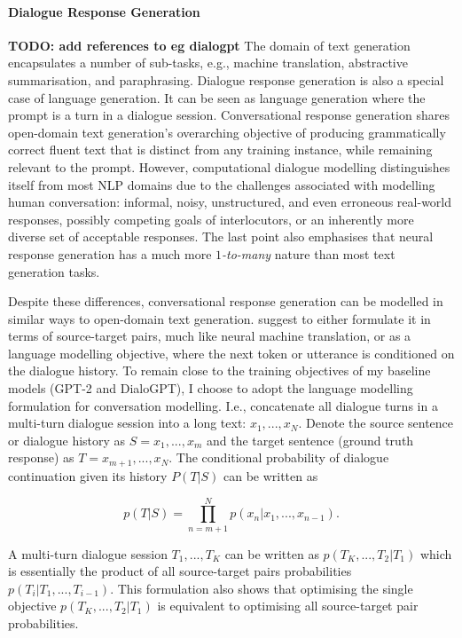 \paragraph{Dialogue Response Generation}
\textbf{TODO: add references to eg dialogpt}
The domain of text generation encapsulates a number of sub-tasks, e.g., machine translation, abstractive summarisation, and paraphrasing. Dialogue response generation is also a special case of language generation. It can be seen as language generation where the prompt is a turn in a dialogue session. Conversational response generation shares open-domain text generation's overarching objective of producing grammatically correct fluent text that is distinct from any training instance, while remaining relevant to the prompt. However, computational dialogue modelling distinguishes itself from most NLP domains due to the challenges associated with modelling human conversation: informal, noisy, unstructured, and even erroneous real-world responses, possibly competing goals of interlocutors, or an inherently more diverse set of acceptable responses. The last point also emphasises that neural response generation has a much more $1$\textit{-to-many} nature than most text generation tasks.

Despite these differences, conversational response generation can be modelled in similar ways to open-domain text generation. \cite{zeng-etal-2020-meddialog} suggest to either formulate it in terms of source-target pairs, much like neural machine translation, or as a language modelling objective, where the next token or utterance is conditioned on the dialogue history. To remain close to the training objectives of my baseline models (GPT-2 and DialoGPT), I choose to adopt the language modelling formulation for conversation modelling. I.e., concatenate all dialogue turns in a multi-turn dialogue session into a long text: $x_1, ..., x_N$. Denote the source sentence or dialogue history as $S = x_1, ..., x_m$ and the target sentence (ground truth response) as $T = x_{m + 1}, ..., x_N$. The conditional probability of dialogue continuation given its history $P(T | S)$ can be written as

\begin{equation}
    p(T | S) = \prod_{n = m + 1}^N p(x_n | x_1, ..., x_{n - 1}).
\end{equation}

A multi-turn dialogue session $T_1, ..., T_K$ can be written as $p(T_K, ..., T_2 | T_1)$ which is essentially the product of all source-target pairs probabilities $p(T_i | T_1, ..., T_{i - 1})$. This formulation also shows that optimising the single objective $p(T_K, ..., T_2 | T_1)$ is equivalent to optimising all source-target pair probabilities.


